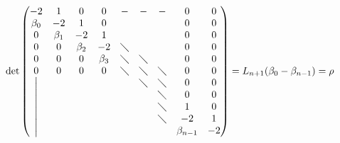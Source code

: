 \[
\det\begin{pmatrix}
-2&1&0&0&\mathbin{-}&\mathbin{-}&\mathbin{-}&0&0\\
\beta_0&-2&1&0&&&&0&0\\
0&\beta_1&-2&1&&&&0&0\\
0&0&\beta_2&-2&\diagdown&&&0&0\\
0&0&0&\beta_3&\diagdown&\diagdown&&0&0\\
0&0&0&0&\diagdown&\diagdown&\diagdown&0&0\\
\big|&&&&&\diagdown&\diagdown&0&0\\
\big|&&&&&&\diagdown&0&0\\
\big|&&&&&&\diagdown&1&0\\
\big|&&&&&&\diagdown&-2&1\\
\big|&&&&&&&\beta_{n-1}&-2
\end{pmatrix}
=L_{n+1}(\beta_0\mathbin{-}\beta_{n-1})=\rho
\]

